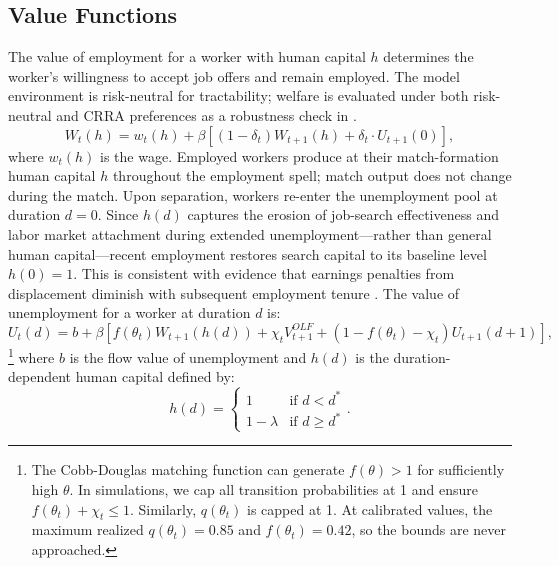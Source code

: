 \documentclass[12pt]{article}
\begin{document}
\subsection{Value Functions}

The value of employment for a worker with human capital $h$ determines the worker's willingness to accept job offers and remain employed. The model environment is risk-neutral for tractability; welfare is evaluated under both risk-neutral and CRRA preferences as a robustness check in .
\begin{equation}
W_t(h) = w_t(h) + \beta \left[ (1 - \delta_t) W_{t+1}(h) + \delta_t \cdot U_{t+1}(0) \right],
\label{eq:value_employed}
\end{equation}
where $w_t(h)$ is the wage. Employed workers produce at their match-formation human capital $h$ throughout the employment spell; match output does not change during the match. Upon separation, workers re-enter the unemployment pool at duration $d = 0$. Since $h(d)$ captures the erosion of job-search effectiveness and labor market attachment during extended unemployment---rather than general human capital---recent employment restores search capital to its baseline level $h(0) = 1$. This is consistent with evidence that earnings penalties from displacement diminish with subsequent employment tenure \citep{jacobson1993earnings}. The value of unemployment for a worker at duration $d$ is:
\begin{equation}
U_t(d) = b + \beta \left[ f(\theta_t) W_{t+1}(h(d)) + \chi_t V^{OLF}_{t+1} + (1 - f(\theta_t) - \chi_t) U_{t+1}(d+1) \right],
\label{eq:value_unemployed}
\end{equation}%
\footnote{The Cobb-Douglas matching function can generate $f(\theta) > 1$ for sufficiently high $\theta$. In simulations, we cap all transition probabilities at 1 and ensure $f(\theta_t) + \chi_t \leq 1$. Similarly, $q(\theta_t)$ is capped at 1. At calibrated values, the maximum realized $q(\theta_t) = 0.85$ and $f(\theta_t) = 0.42$, so the bounds are never approached.}%
where $b$ is the flow value of unemployment and $h(d)$ is the duration-dependent human capital defined by:
\begin{equation}
h(d) = \begin{cases} 1 & \text{if } d < d^* \\ 1 - \lambda & \text{if } d \geq d^* \end{cases}.
\label{eq:depreciation}
\end{equation}
\end{document}
